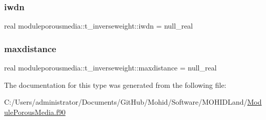 \subsubsection{\texorpdfstring{iwdn}{iwdn}}
{\footnotesize\ttfamily real moduleporousmedia\+::t\+\_\+inverseweight\+::iwdn = null\+\_\+real\hspace{0.3cm}{\ttfamily [private]}}

\mbox{\label{structmoduleporousmedia_1_1t__inverseweight_a9336b7bb2cc12cdc96bd718a32ae408c}} 
\subsubsection{\texorpdfstring{maxdistance}{maxdistance}}
{\footnotesize\ttfamily real moduleporousmedia\+::t\+\_\+inverseweight\+::maxdistance = null\+\_\+real\hspace{0.3cm}{\ttfamily [private]}}



The documentation for this type was generated from the following file\+:\begin{DoxyCompactItemize}
\item 
C\+:/\+Users/administrator/\+Documents/\+Git\+Hub/\+Mohid/\+Software/\+M\+O\+H\+I\+D\+Land/\mbox{\hyperlink{_module_porous_media_8f90}{Module\+Porous\+Media.\+f90}}\end{DoxyCompactItemize}
